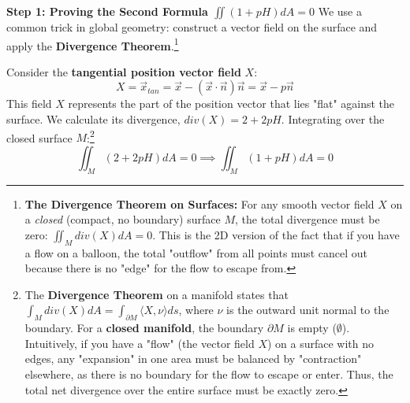 \begin{solution}
\textbf{Step 1: Proving the Second Formula $\iint (1+pH) dA = 0$}
We use a common trick in global geometry: construct a vector field on the surface and apply the \textbf{Divergence Theorem}.\footnote{\textbf{The Divergence Theorem on Surfaces:} For any smooth vector field $X$ on a \textit{closed} (compact, no boundary) surface $M$, the total divergence must be zero: $\iint_M div(X) dA = 0$. This is the 2D version of the fact that if you have a flow on a balloon, the total "outflow" from all points must cancel out because there is no "edge" for the flow to escape from.}

Consider the \textbf{tangential position vector field} $X$:
\[ X = \vec{x}_{tan} = \vec{x} - (\vec{x} \cdot \vec{n})\vec{n} = \vec{x} - p\vec{n} \]
This field $X$ represents the part of the position vector that lies "flat" against the surface. We calculate its divergence, $div(X) = 2 + 2pH$.
Integrating over the closed surface $M$:\footnote{The \textbf{Divergence Theorem} on a manifold states that $\int_M div(X) dA = \int_{\partial M} \langle X, \nu \rangle ds$, where $\nu$ is the outward unit normal to the boundary. For a \textbf{closed manifold}, the boundary $\partial M$ is empty ($\emptyset$). Intuitively, if you have a "flow" (the vector field $X$) on a surface with no edges, any "expansion" in one area must be balanced by "contraction" elsewhere, as there is no boundary for the flow to escape or enter. Thus, the total net divergence over the entire surface must be exactly zero.}
\[ \iint_M (2 + 2pH) dA = 0 \implies \iint_M (1 + pH) dA = 0 \]


\end{solution}
